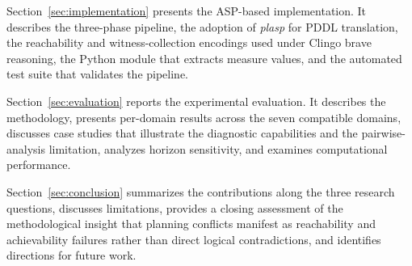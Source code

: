 Section~\ref{sec:implementation} presents the \ac{ASP}-based implementation. It describes the three-phase pipeline, the adoption of \textit{plasp} for \ac{PDDL} translation, the reachability and witness-collection encodings used under Clingo brave reasoning, the Python module that extracts measure values, and the automated test suite that validates the pipeline.

Section~\ref{sec:evaluation} reports the experimental evaluation. It describes the methodology, pre\-sents per-domain results across the seven compatible domains, discusses case studies that illustrate the diagnostic capabilities and the pairwise-analysis limitation, analyzes horizon sensitivity, and examines computational performance.

Section~\ref{sec:conclusion} summarizes the contributions along the three research questions, discusses limitations, provides a closing assessment of the methodological insight that planning conflicts manifest as reachability and achievability failures rather than direct logical contradictions, and identifies directions for future work.
